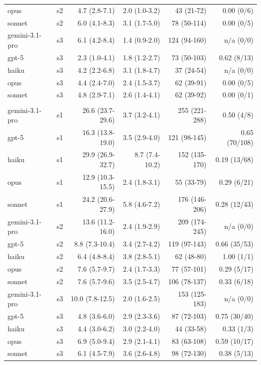 \documentclass[10pt]{article} %
\begin{document}
\begin{table}[h]
\begin{center}
\begin{tabular}{llrrrr}
        opus           & s2 & 4.7 (2.8-7.1)    & 2.0 (1.0-3.2)  & 43 (21-72)    & 0.00 (0/6) \\
        sonnet         & s2 & 6.0 (4.1-8.3)    & 3.1 (1.7-5.0)  & 78 (50-114)   & 0.00 (0/5) \\
        gemini-3.1-pro & s3 & 6.1 (4.2-8.4)    & 1.4 (0.9-2.0)  & 124 (94-160)  & n/a (0/0) \\
        gpt-5          & s3 & 2.3 (1.0-4.1)    & 1.8 (1.2-2.7)  & 73 (50-103)   & 0.62 (8/13) \\
        haiku          & s3 & 4.2 (2.2-6.8)    & 3.1 (1.8-4.7)  & 37 (24-54)    & n/a (0/0) \\
        opus           & s3 & 4.4 (2.4-7.0)    & 2.4 (1.5-3.7)  & 62 (39-91)    & 0.00 (0/5) \\
        sonnet         & s3 & 4.8 (2.9-7.1)    & 2.6 (1.4-4.1)  & 62 (39-92)    & 0.00 (0/1) \\
        \hline \\
        gemini-3.1-pro & s1 & 26.6 (23.7-29.6) & 3.7 (3.2-4.1)  & 255 (221-288) & 0.50 (4/8) \\
        gpt-5          & s1 & 16.3 (13.8-19.0) & 3.5 (2.9-4.0)  & 121 (98-145)  & 0.65 (70/108) \\
        haiku          & s1 & 29.9 (26.9-32.7) & 8.7 (7.4-10.2) & 152 (135-170) & 0.19 (13/68) \\
        opus           & s1 & 12.9 (10.3-15.5) & 2.4 (1.8-3.1)  & 55 (33-79)    & 0.29 (6/21) \\
        sonnet         & s1 & 24.2 (20.6-27.9) & 5.8 (4.6-7.2)  & 176 (146-206) & 0.28 (12/43) \\
        gemini-3.1-pro & s2 & 13.6 (11.2-16.0) & 2.4 (1.9-2.9)  & 209 (174-245) & n/a (0/0) \\
        gpt-5          & s2 & 8.8 (7.3-10.4)   & 3.4 (2.7-4.2)  & 119 (97-143)  & 0.66 (35/53) \\
        haiku          & s2 & 6.4 (4.8-8.4)    & 3.8 (2.8-5.1)  & 62 (48-80)    & 1.00 (1/1) \\
        opus           & s2 & 7.6 (5.7-9.7)    & 2.4 (1.7-3.3)  & 77 (57-101)   & 0.29 (5/17) \\
        sonnet         & s2 & 7.6 (5.7-9.6)    & 3.5 (2.5-4.7)  & 106 (78-137)  & 0.33 (6/18) \\
        gemini-3.1-pro & s3 & 10.0 (7.8-12.5)  & 2.0 (1.6-2.5)  & 153 (125-183) & n/a (0/0) \\
        gpt-5          & s3 & 4.8 (3.6-6.0)    & 2.9 (2.3-3.6)  & 87 (72-103)   & 0.75 (30/40) \\
        haiku          & s3 & 4.4 (3.0-6.2)    & 3.0 (2.2-4.0)  & 44 (33-58)    & 0.33 (1/3) \\
        opus           & s3 & 6.9 (5.0-9.4)    & 2.9 (2.1-4.1)  & 83 (63-108)   & 0.59 (10/17) \\
        sonnet         & s3 & 6.1 (4.5-7.9)    & 3.6 (2.6-4.8)  & 98 (72-130)   & 0.38 (5/13) \\
    \end{tabular}
    \end{center}
    \end{table}
\end{document}
